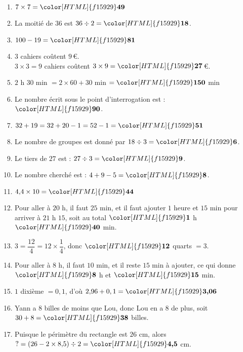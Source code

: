 	
\clearpage
	
\begin{Correction}
\begin{EXO}{}{}

\begin{enumerate}[itemsep=1em, label=\arabic*)]
\item $7 \times 7={\color[HTML]{f15929}\boldsymbol{49}}$
\item La moitié de $36$ est $36\div 2={\color[HTML]{f15929}\boldsymbol{18}}$.
\item $100-19={\color[HTML]{f15929}\boldsymbol{81}}$
\item $3$ cahiers coûtent $9$\,\euro{}.\\
			$3\times3=9$ cahiers coûtent $3\times9={\color[HTML]{f15929}\boldsymbol{27}}$\,\euro{}.
\item $2$ h $30$ min $=2\times 60+ 30$ min $={\color[HTML]{f15929}\boldsymbol{150}}$ min
\item Le nombre écrit sous le point d'interrogation est : ${\color[HTML]{f15929}\boldsymbol{90}}$.
\item $32+19=32+20-1=52-1={\color[HTML]{f15929}\boldsymbol{51}}$
\item Le nombre de groupes est donné par $18\div 3={\color[HTML]{f15929}\boldsymbol{6}}$.
\item Le tiers de $27$ est : $27\div 3={\color[HTML]{f15929}\boldsymbol{9}}$.
\item Le nombre cherché est : $4+9-5={\color[HTML]{f15929}\boldsymbol{8}}$.
\item $4{,}4\times 10={\color[HTML]{f15929}\boldsymbol{44}}$ 
\item Pour aller à $20$ h, il faut $25$ min, et il faut ajouter $1$ heure et $15$ min pour arriver à $21$ h $15$, soit au total ${\color[HTML]{f15929}\boldsymbol{1}}$ h ${\color[HTML]{f15929}\boldsymbol{40}}$ min.
\item $3=\dfrac{12}{4}=12\times \dfrac{1}{4}$, donc ${\color[HTML]{f15929}\boldsymbol{12}}$ quarts $=3$. 
\item Pour aller à $8$ h, il faut $10$ min, et il reste $15$ min à ajouter, ce qui donne
${\color[HTML]{f15929}\boldsymbol{8}}$ h et ${\color[HTML]{f15929}\boldsymbol{15}}$ min.
\item $1$ dixième $=0,1$, d'où $2{,}96+0,1 ={\color[HTML]{f15929}\boldsymbol{3{,}06}}$
\item Yann a $8$ billes de moins que Lou, donc Lou en a $8$ de plus, soit $30+8={\color[HTML]{f15929}\boldsymbol{38}}$ billes.
\item Puisque le périmètre du rectangle est $26$ cm, alors $\text{?}=(26-2\times 8{,}5)\div 2={\color[HTML]{f15929}\boldsymbol{4{,}5}}$ cm.

\end{enumerate}
\end{EXO}
\end{Correction}
